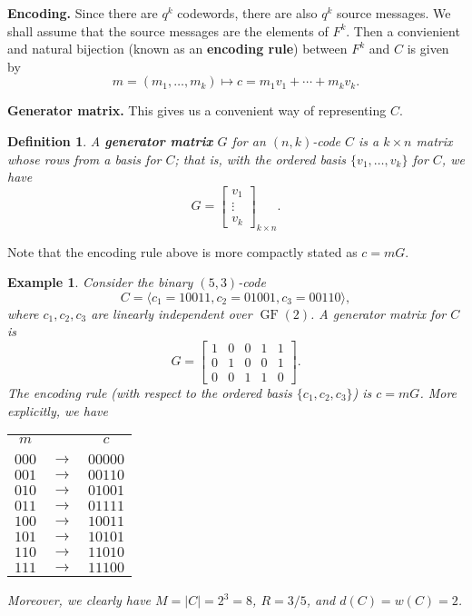 \documentclass[10pt]{article}
\DeclareMathOperator{\GF}{GF}
\theoremstyle{newstyle}
\newtheorem{defn}[thm]{Definition}
\newtheorem{exmp}[thm]{Example}
\begin{document}
{\bf Encoding.} Since there are $q^k$ codewords, there are also $q^k$ source messages. We shall
assume that the source messages are the elements of $F^k$. Then a convienient and 
natural bijection (known as an {\bf encoding rule}) between $F^k$ and $C$ is given by 
\[ m = (m_1, \dots, m_k) \mapsto c = m_1v_1 + \cdots + m_kv_k. \]

{\bf Generator matrix.} This gives us a convenient way of representing $C$. 

\begin{defn}
A {\bf generator matrix} $G$ for an $(n, k)$-code $C$ is a $k \times n$ matrix whose rows 
from a basis for $C$; that is, with the ordered basis $\{v_1, \dots, v_k\}$ for $C$, 
we have 
\[ G = \begin{bmatrix} v_1 \\ \vdots \\ v_k \end{bmatrix}_{k\times n}. \]
\end{defn}

Note that the encoding rule above is more compactly stated as $c = mG$. 

\begin{exmp}
Consider the binary $(5, 3)$-code 
\[ C = \langle c_1 = 10011, c_2 = 01001, c_3 = 00110 \rangle, \]
where $c_1, c_2, c_3$ are linearly independent over $\GF(2)$. A generator matrix for $C$ is 
\[ G = \begin{bmatrix} 1 & 0 & 0 & 1 & 1 \\ 0 & 1 & 0 & 0 & 1 \\ 0 & 0 & 1 & 1 & 0 \end{bmatrix}. \]
The encoding rule (with respect to the ordered basis $\{c_1, c_2, c_3\}$) is $c = mG$. More explicitly, 
we have 

\begin{table}[H]
\centering
\begin{tabular}{ccc}
$m$   &               & $c$     \\
      &               &         \\
$000$ & $\rightarrow$ & $00000$ \\
$001$ & $\rightarrow$ & $00110$ \\
$010$ & $\rightarrow$ & $01001$ \\
$011$ & $\rightarrow$ & $01111$ \\
$100$ & $\rightarrow$ & $10011$ \\
$101$ & $\rightarrow$ & $10101$ \\
$110$ & $\rightarrow$ & $11010$ \\
$111$ & $\rightarrow$ & $11100$
\end{tabular}
\end{table}

Moreover, we clearly have $M = |C| = 2^3 = 8$, $R = 3/5$, and $d(C) = w(C) = 2$. 
\end{exmp}
\end{document}
